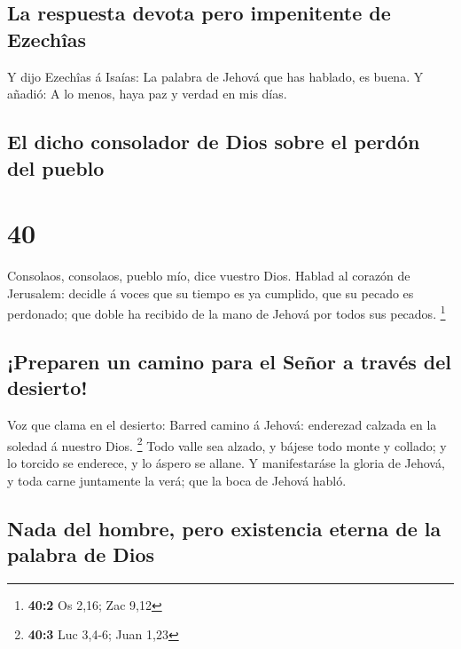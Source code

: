 \hypertarget{la-respuesta-devota-pero-impenitente-de-ezechuxeeas}{%
\subsection{La respuesta devota pero impenitente de
Ezechîas}\label{la-respuesta-devota-pero-impenitente-de-ezechuxeeas}}

 Y dijo Ezechîas á Isaías: La palabra de Jehová que has
hablado, es buena. Y añadió: A lo menos, haya paz y verdad en mis días.

\hypertarget{el-dicho-consolador-de-dios-sobre-el-perduxf3n-del-pueblo}{%
\subsection{El dicho consolador de Dios sobre el perdón del
pueblo}\label{el-dicho-consolador-de-dios-sobre-el-perduxf3n-del-pueblo}}

\hypertarget{section-39}{%
\section{40}\label{section-39}}

 Consolaos, consolaos, pueblo mío, dice vuestro Dios.
 Hablad al corazón de Jerusalem: decidle á voces que su
tiempo es ya cumplido, que su pecado es perdonado; que doble ha recibido
de la mano de Jehová por todos sus pecados. \footnote{\textbf{40:2} Os
  2,16; Zac 9,12}

\hypertarget{preparen-un-camino-para-el-seuxf1or-a-travuxe9s-del-desierto}{%
\subsection{¡Preparen un camino para el Señor a través del
desierto!}\label{preparen-un-camino-para-el-seuxf1or-a-travuxe9s-del-desierto}}

 Voz que clama en el desierto: Barred camino á Jehová:
enderezad calzada en la soledad á nuestro Dios. \footnote{\textbf{40:3}
  Luc 3,4-6; Juan 1,23}  Todo valle sea alzado, y bájese
todo monte y collado; y lo torcido se enderece, y lo áspero se allane.
 Y manifestaráse la gloria de Jehová, y toda carne
juntamente la verá; que la boca de Jehová habló.

\hypertarget{nada-del-hombre-pero-existencia-eterna-de-la-palabra-de-dios}{%
\subsection{Nada del hombre, pero existencia eterna de la palabra de
Dios}\label{nada-del-hombre-pero-existencia-eterna-de-la-palabra-de-dios}}

